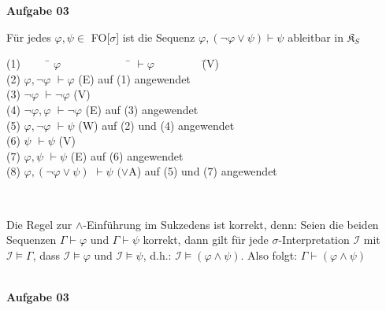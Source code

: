 \documentclass[a4paper,10pt]{article}
\begin{document}
	\textbf{Aufgabe 03}
	\begin{compactenum} [(a)]
		\item Für jedes $ \varphi, \psi \in $ FO$[ \sigma $] ist die Sequenz $ \varphi, (\lnot \varphi \vee \psi ) \vdash \psi $ ableitbar in $ \mathfrak{K}_S $
		\begin{tabbing}
			(1) $ \qquad $ \= $ \varphi \qquad \qquad \qquad $ \= $\vdash \varphi \qquad \qquad $ \= (V)\\
			(2) \> $ \varphi, \lnot \varphi $ \> $\vdash \varphi $ \> (E) auf (1) angewendet \\
			(3) \> $ \lnot \varphi $ \> $ \vdash \lnot \varphi $ \> (V)\\
			(4) \> $ \lnot \varphi, \varphi $ \> $ \vdash \lnot \varphi $ \> (E) auf (3) angewendet\\
			(5) \> $ \varphi, \lnot \varphi $ \> $ \vdash \psi $ \> (W) auf (2) und (4) angewendet\\
			(6) \>$ \psi $ \> $ \vdash \psi $ \> (V)\\
			(7) \>$ \varphi, \psi $ \> $ \vdash \psi $ \> (E) auf (6) angewendet\\
			(8) \> $ \varphi, (\lnot \varphi \vee \psi) $ \> $ \vdash \psi $ \>$ (\vee $A) auf (5) und (7) angewendet
		\end{tabbing}\
		
		\item Die Regel zur $ \wedge $-Einführung im Sukzedens ist korrekt, denn: Seien die beiden Sequenzen $ \Gamma \vdash \varphi $  und $ \Gamma \vdash \psi $ korrekt, dann gilt für jede $ \sigma $-Interpretation $ \mathcal{I} $ mit $ \mathcal{I} \models \Gamma $, dass $ \mathcal{I} \models \varphi $ und $ \mathcal{I} \models \psi $, d.h.: $ \mathcal{I} \models (\varphi \wedge \psi) $. Also folgt: $ \Gamma \vdash (\varphi \wedge \psi) $
	\end{compactenum}\ \\
	\textbf{Aufgabe 03}
\end{document}
